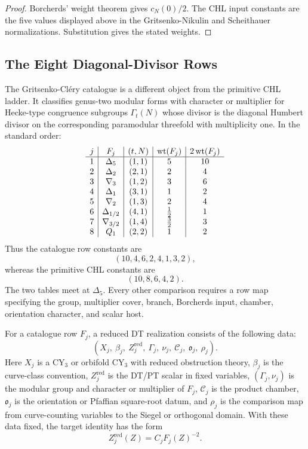 \begin{proof}
Borcherds' weight theorem gives \(c_N(0)/2\).  The CHL input constants
are the five values displayed above in the Gritsenko-Nikulin and
Scheithauer normalizations.  Substitution gives the stated weights.
\end{proof}

\subsection{The Eight Diagonal-Divisor Rows}
\label{subsec:eight-diagonal-divisor-rows}

The Gritsenko-Cl\'ery catalogue is a different object from the primitive
CHL ladder.  It classifies genus-two modular forms with character or
multiplier for Hecke-type congruence subgroups \(\Gamma_t(N)\) whose
divisor is the diagonal Humbert divisor on the corresponding
paramodular threefold with multiplicity one.  In the standard order:
\[
\begin{array}{c|c|c|c|c}
j & F_j & (t,N) & \operatorname{wt}(F_j) & 2\operatorname{wt}(F_j)\\
\hline
1 & \Delta_5 & (1,1) & 5 & 10\\
2 & \Delta_2 & (2,1) & 2 & 4\\
3 & \nabla_3 & (1,2) & 3 & 6\\
4 & \Delta_1 & (3,1) & 1 & 2\\
5 & \nabla_2 & (1,3) & 2 & 4\\
6 & \Delta_{1/2} & (4,1) & \tfrac12 & 1\\
7 & \nabla_{3/2} & (1,4) & \tfrac32 & 3\\
8 & Q_1 & (2,2) & 1 & 2
\end{array}
\]
Thus the catalogue row constants are
\[
        (10,4,6,2,4,1,3,2),
\]
whereas the primitive CHL constants are
\[
        (10,8,6,4,2).
\]
The two tables meet at \(\Delta_5\).  Every other comparison requires a
row map specifying the group, multiplier cover, branch, Borcherds
input, chamber, orientation character, and scalar host.

\begin{proposition}
\label{prop:dt-host-data-required}
For a catalogue row \(F_j\), a reduced DT realization consists of the
following data:
\[
        (X_j,\ \beta_j,\ Z_j^{\mathrm{red}},\
        \Gamma_j,\ \nu_j,\ \mathcal C_j,\ \mathfrak o_j,\ \rho_j).
\]
Here \(X_j\) is a CY$_3$ or orbifold CY$_3$ with reduced obstruction
theory, \(\beta_j\) is the curve-class convention, \(Z_j^{\mathrm{red}}\)
is the DT/PT scalar in fixed variables, \((\Gamma_j,\nu_j)\) is the
modular group and character or multiplier of \(F_j\), \(\mathcal C_j\)
is the product chamber, \(\mathfrak o_j\) is the orientation or
Pfaffian square-root datum, and \(\rho_j\) is the comparison map from
curve-counting variables to the Siegel or orthogonal domain.  With
these data fixed, the target identity has the form
\[
        Z_j^{\mathrm{red}}(Z)=C_jF_j(Z)^{-2}.
\]
\end{proposition}

